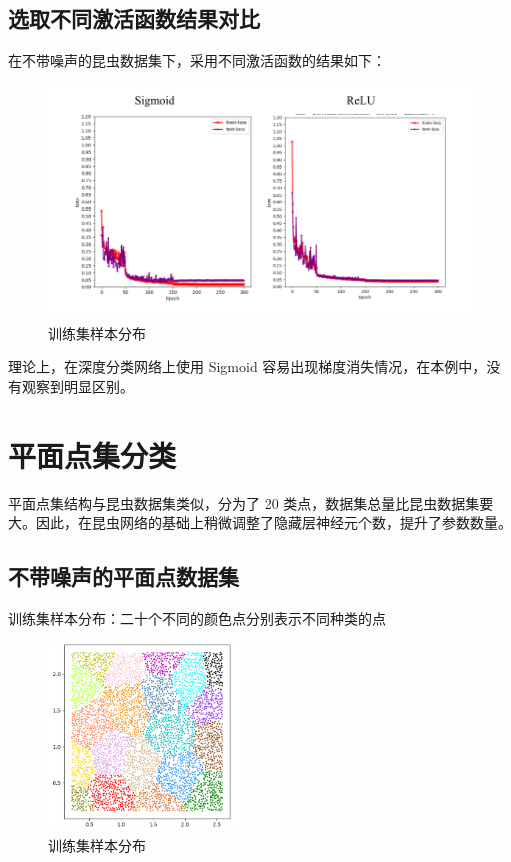 \documentclass[12pt]{article}
\begin{document}
	\subsection{选取不同激活函数结果对比}
	
	在不带噪声的昆虫数据集下，采用不同激活函数的结果如下：
	
	\begin{figure}[H]
		\centering
		\includegraphics[width=4.5in]{./images/insects_sigmoid_relu.png}
		\centering
		\caption{训练集样本分布}
	\end{figure}
	
	理论上，在深度分类网络上使用 Sigmoid 容易出现梯度消失情况，在本例中，没有观察到明显区别。
	
	\section{平面点集分类}
	
	平面点集结构与昆虫数据集类似，分为了 20 类点，数据集总量比昆虫数据集要大。因此，在昆虫网络的基础上稍微调整了隐藏层神经元个数，提升了参数数量。
	
	
	\subsection{不带噪声的平面点数据集}
	
	训练集样本分布：二十个不同的颜色点分别表示不同种类的点
	
	\begin{figure}[H]
		\centering
		\includegraphics[width=2in]{./images/plane_normal_train_dist.png}
		\centering
		\caption{训练集样本分布}
	\end{figure}
	
\end{document}

